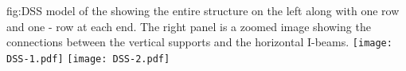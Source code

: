 \begin{dunefigure}{fig:DSS}
  {\threed model of the  showing the entire
  structure on the left along with one  row and one
  - row at each end. The right panel is a zoomed image
  showing the connections between the vertical supports and the
  horizontal I-beams.}
\texttt{[image: DSS-1.pdf]}
 \texttt{[image: DSS-2.pdf]}
\end{dunefigure}

